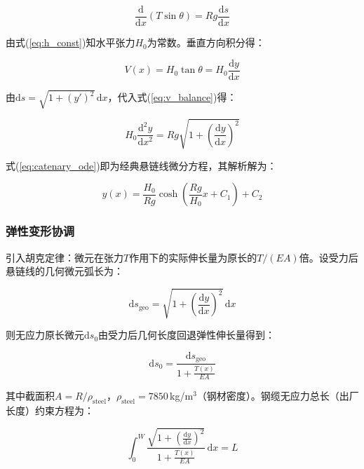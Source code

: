 \documentclass[12pt,a4paper]{ctexart}
\begin{document}
\begin{equation}
  \frac{\mathrm{d}}{\mathrm{d}x}\left(T\sin\theta\right) = Rg\frac{\mathrm{d}s}{\mathrm{d}x}
  \label{eq:v_balance}
\end{equation}

由式(\ref{eq:h_const})知水平张力$H_0$为常数。垂直方向积分得：

\begin{equation}
  V(x) = H_0\tan\theta = H_0\frac{\mathrm{d}y}{\mathrm{d}x}
  \label{eq:tan_theta}
\end{equation}

由$\mathrm{d}s = \sqrt{1 + (y')^2}\,\mathrm{d}x$，代入式(\ref{eq:v_balance})得：

\begin{equation}
  H_0\frac{\mathrm{d}^2y}{\mathrm{d}x^2} = Rg\sqrt{1 + \left(\frac{\mathrm{d}y}{\mathrm{d}x}\right)^2}
  \label{eq:catenary_ode}
\end{equation}

式(\ref{eq:catenary_ode})即为经典悬链线微分方程，其解析解为：

\begin{equation}
  y(x) = \frac{H_0}{Rg}\cosh\left(\frac{Rg}{H_0}x + C_1\right) + C_2
  \label{eq:catenary_analytic}
\end{equation}

\subsubsection{弹性变形协调}

引入胡克定律：微元在张力$T$作用下的实际伸长量为原长的$T/(EA)$倍。设受力后悬链线的几何微元弧长为：

\begin{equation}
  \mathrm{d}s_{\text{geo}} = \sqrt{1 + \left(\frac{\mathrm{d}y}{\mathrm{d}x}\right)^2}\,\mathrm{d}x
  \label{eq:ds_geo}
\end{equation}

则无应力原长微元$\mathrm{d}s_0$由受力后几何长度回退弹性伸长量得到：

\begin{equation}
  \mathrm{d}s_0 = \frac{\mathrm{d}s_{\text{geo}}}{1 + \frac{T(x)}{EA}}
  \label{eq:hooke_ds}
\end{equation}

其中截面积$A = R / \rho_{\text{steel}}$，$\rho_{\text{steel}} = 7850$\,kg/m$^3$（钢材密度）。钢缆无应力总长（出厂长度）约束方程为：

\begin{equation}
  \int_{0}^{W} \frac{\sqrt{1 + \left(\frac{\mathrm{d}y}{\mathrm{d}x}\right)^2}}{1 + \frac{T(x)}{EA}}\,\mathrm{d}x = L
  \label{eq:total_length}
\end{equation}
\end{document}

